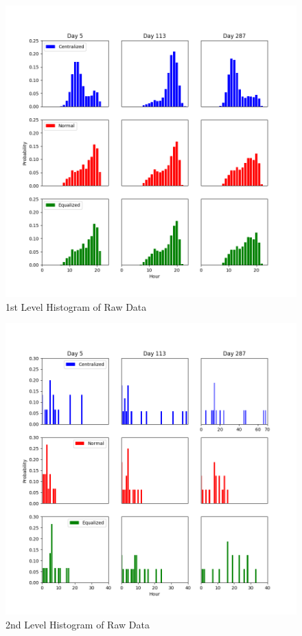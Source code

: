 \documentclass[a4paper]{IEEEtran}
\begin{document}
			\begin{figure}[!ht]
				\centering
				\includegraphics[width=\linewidth]{fig/Raw1stLevelHist.png}
				\caption{1st Level Histogram of Raw Data}
				\label{fig:raw-hist-1st}
			\end{figure}
			
			\begin{figure}[!ht]
				\centering
				\includegraphics[width=\linewidth]{fig/Raw2ndLevelHist}
				\caption{2nd Level Histogram of Raw Data}
				\label{fig:raw-hist-2nd}
			\end{figure}
			
\end{document}

